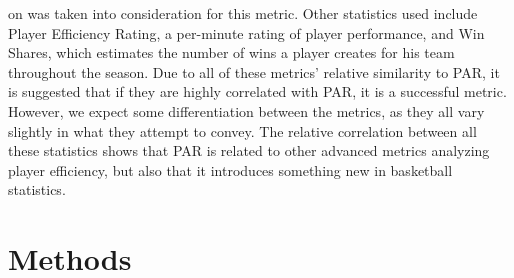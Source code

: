 \documentclass[12pt, titlepage]{article}
\begin{document}
on was taken into consideration for this metric. Other statistics used include Player Efficiency Rating, a 
per-minute 
rating of player performance, and Win Shares, which estimates the number of wins a player creates 
for his team throughout the season. Due to all of these metrics' relative similarity to PAR, it is suggested 
that if they are highly correlated with PAR, it is a successful metric. However, we expect some differentiation 
between the metrics, as they all vary slightly in what they attempt to convey. The relative correlation 
between all these statistics shows that PAR is related to other advanced metrics analyzing player efficiency, 
but also that it introduces something new in basketball statistics.



\section{Methods}
\end{document}
